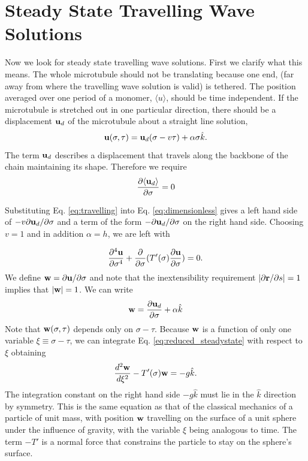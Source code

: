 \documentclass[11pt]{ucthesis}
\def\br{{\bf r}}
\def\bu{{\bf u}}
\def\bw{{\bf w}}
\begin{document}
\section{Steady State Travelling Wave Solutions}

Now we look for steady state travelling wave solutions. First we clarify what this means.
The whole microtubule should not be translating because one end, (far away from where
the travelling wave solution is valid) is tethered. 
The position averaged over one period of a monomer, $\langle u \rangle$, should be  time independent.
If the microtubule is stretched out
in one particular direction, there should be a displacement $\bu_d$ of the microtubule about a straight
line solution,
\begin{equation}
\label{eq:travelling}
\bu(\sigma, \tau) = \bu_d(\sigma-v\tau) + \alpha \sigma {\hat k}.
\end{equation}
The term $\bu_d$ describes a displacement that travels along the backbone of the chain maintaining its shape.
Therefore we require
\begin{equation}
\label{eq:ud_constraint}
\frac{\partial \langle \bu_d \rangle}{\partial \sigma} = 0
\end{equation}

Substituting Eq. \ref{eq:travelling} into Eq. \ref{eq:dimensionless} gives a left hand side
of $-v \partial \bu_d/\partial \sigma$ and a term of the form $-\partial \bu_d/\partial \sigma$ on
the right hand side. Choosing $v = 1$ and in addition $\alpha = h$, we are left with

\begin{equation}
\label{eq:reduced_steadystate}
\frac{\partial^4 \bu}{\partial \sigma^4} + \frac{\partial}{\partial \sigma}(T'(\sigma)\frac{\partial \bu}{\partial \sigma}) = 0.
\end{equation}
We define $\bw = \partial \bu/\partial \sigma$  and
note that the inextensibility requirement $|\partial \br/\partial s| = 1$ implies that $|\bw| = 1$. We can write 
\begin{equation}
\label{eq:bw=bd_alpha}
\bw  = \frac{\partial \bu_d}{\partial \sigma} + \alpha {\hat k}
\end{equation}
Note that $\bw(\sigma,\tau)$ depends only on $\sigma -\tau$. Because $\bw$ is a function
of only one variable $\xi \equiv \sigma -\tau$, 
we can 
integrate Eq. \ref{eq:reduced_steadystate} with respect to $\xi$ obtaining
\begin{equation}
\label{eq:sphericalmotion}
\frac{d^2 \bw}{d \xi^2} - T'(\sigma)\bw = -g {\hat k}.
\end{equation}
The integration constant on the right hand side $-g {\hat k}$ must lie in the $\hat k$ direction by symmetry.
This is the same equation as that of the classical mechanics of a particle of unit mass, with position $\bw$ travelling on the surface of a 
unit sphere under the influence of gravity, with the variable $\xi$ being analogous to time. The term $-T'$ is a normal
force that constrains the particle to stay on the sphere's surface.
\end{document}
